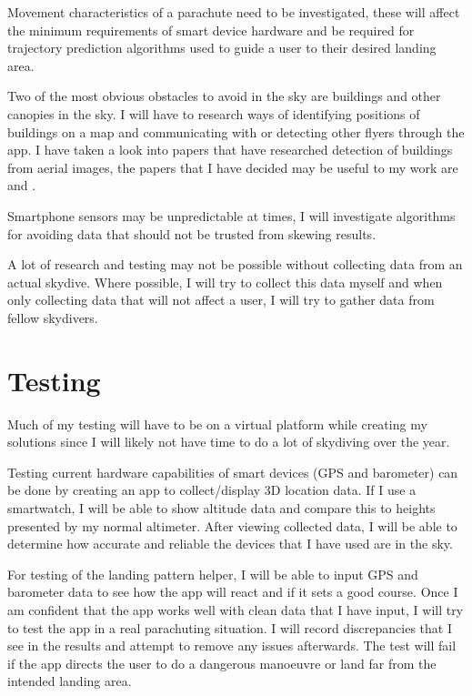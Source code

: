 \documentclass{article}
\begin{document}
Movement characteristics of a parachute need to be investigated, these will affect the minimum requirements of smart device hardware and be required for trajectory prediction algorithms used to guide a user to their desired landing area.

Two of the most obvious obstacles to avoid in the sky are buildings and other canopies in the sky. I will have to research ways of identifying positions of buildings on a map and communicating with or detecting other flyers through the app. I have taken a look into papers that have researched detection of buildings from aerial images, the papers that I have decided may be useful to my work are \autocite{buildings1} and \autocite{buildings2}.

Smartphone sensors may be unpredictable at times, I will investigate algorithms for avoiding data that should not be trusted from skewing results.

A lot of research and testing may not be possible without collecting data from an actual skydive. Where possible, I will try to collect this data myself and when only collecting data that will not affect a user, I will try to gather data from fellow skydivers.

\section{Testing}
Much of my testing will have to be on a virtual platform while creating my solutions since I will likely not have time to do a lot of skydiving over the year.

Testing current hardware capabilities of smart devices (GPS and barometer) can be done by creating an app to collect/display 3D location data. If I use a smartwatch, I will be able to show altitude data and compare this to heights presented by my normal altimeter. After viewing collected data, I will be able to determine how accurate and reliable the devices that I have used are in the sky.

For testing of the landing pattern helper, I will be able to input GPS and barometer data to see how the app will react and if it sets a good course. Once I am confident that the app works well with clean data that I have input, I will try to test the app in a real parachuting situation. I will record discrepancies that I see in the results and attempt to remove any issues afterwards. The test will fail if the app directs the user to do a dangerous manoeuvre or land far from the intended landing area.
\end{document}
